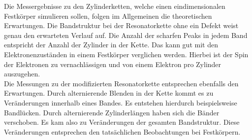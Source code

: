 Die Messergebnisse zu den Zylinderketten, welche einen eindimensionalen Festkörper simulieren sollen, folgen im Allgemeinen die theoretischen Erwartungen. Die Bandstruktur bei der Resonatorkette ohne ein Defekt weist genau den erwarteten Verlauf auf. 
Die Anzahl der scharfen Peaks in jedem Band entspricht der Anzahl der Zylinder in der Kette. Das kann gut mit den Elektronenzuständen in einem Festkörper verglichen werden. Hierbei ist der Spin der Elektronen zu vernachlässigen und von einem Elektron pro Zylinder auszugehen. \\
Die Messungen zu der modifizierten Resonatorkette entsprechen ebenfalls den Erwartungen. Durch alternierende Blenden in der Kette kommt es zu Veränderungen innerhalb eines Bandes. Es entstehen hierdurch beispielsweise Bandlücken. 
Durch alternierende Zylinderlängen haben sich die Bänder verschoben. Es kam also zu Veränderungen der gesamten Bandstruktur. Diese Veränderungen entsprechen den tatsächlichen Beobachtungen bei Festkörpern. 
